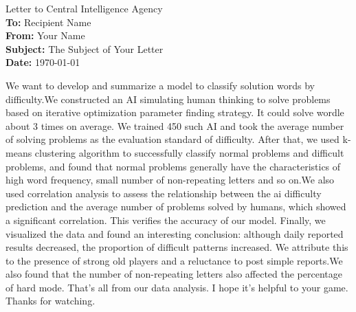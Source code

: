 \documentclass[12pt]{article}  %
\begin{document}
\clearpage
\pagestyle{fancy}
\fancyhead{} %
\begin{letter}{Letter to Central Intelligence Agency}
	\textbf{}\\
	\textbf{To:} Recipient Name \\
	\textbf{From:} Your Name \\
	\textbf{Subject:} The Subject of Your Letter \\
	\textbf{Date:} \today \\
	\textbf{}
	\begin{multicols}{2}
	We want to develop and summarize a model to classify solution words by difficulty.We constructed an AI
	simulating human thinking to solve problems based
	on iterative optimization parameter finding strategy.
	It could solve wordle about 3 times on average. We
	trained 450 such AI and took the average number of
	solving problems as the evaluation standard of difficulty. After that, we used k-means clustering algorithm
	to successfully classify normal problems and difficult
	problems, and found that normal problems generally
	have the characteristics of high word frequency, small
	number of non-repeating letters and so on.We also used
	correlation analysis to assess the relationship between
	the ai difficulty prediction and the average number
	of problems solved by humans, which showed a significant correlation. This verifies the accuracy of our
	model.
	Finally, we visualized the data and found an interesting conclusion: although daily reported results decreased, the proportion of difficult patterns increased.
	We attribute this to the presence of strong old players
	and a reluctance to post simple reports.We also found
	that the number of non-repeating letters also affected
	the percentage of hard mode.
	That’s all from our data analysis. I hope it’s helpful
	to your game. Thanks for watching.
	\end{multicols}
	
\end{letter}




\setcounter{savedpage}{\value{page}}
 
\setcounter{page}{\value{savedpage}}
\end{document}
